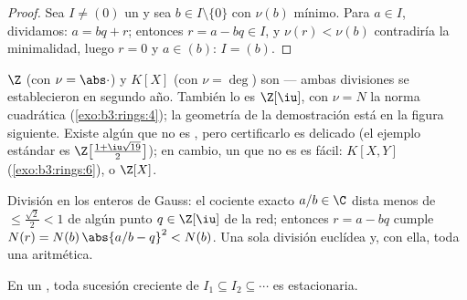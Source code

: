 \begin{proof}
Sea $I \neq (0)$ un  y sea
$b \in I \setminus\{0\}$ con $\nu(b)$ mínimo. Para $a \in I$, dividamos:
$a = bq + r$; entonces $r = a
- bq \in I$, y $\nu(r) < \nu(b)$ contradiría la minimalidad, luego
$r = 0$ y $a \in (b)$: $I = (b)$.
\end{proof}

\begin{example}\label{ex:b3:rings:euclidean}
$\Z$ (con $\nu = \abs\cdot$) y $K[X]$ (con $\nu = \deg$) son
 --- ambas divisiones se
establecieron en segundo año. También lo es $\Z[\iu]$, con $\nu = N$ la
norma cuadrática (\cref{exo:b3:rings:4}); la geometría de la
demostración está en la figura siguiente. Existe algún
 que no es
, pero certificarlo es delicado
(el ejemplo estándar es $\Z\bigl[\frac{1+\iu\sqrt{19}}2\bigr]$); en
cambio, un  que no es
 es fácil: $K[X, Y]$
(\cref{exo:b3:rings:6}), o $\Z[X]$.
\end{example}

\begin{omfigure}

{\small División en los enteros de Gauss: el cociente exacto
$a/b \in \C$ dista menos de $\leq \frac{\sqrt2}{2} < 1$ de algún punto
$q \in \Z[\iu]$ de la red; entonces $r = a - bq$ cumple $N(r) =
N(b)\,\abs{a/b - q}^2 < N(b)$. Una sola división
euclídea y, con ella, toda una
aritmética.}
\end{omfigure}

\begin{lemma}
\label{lem:b3:rings:acc}
En un , toda sucesión creciente de
 $I_1 \subseteq I_2
\subseteq \cdots$ es estacionaria.
\end{lemma}

